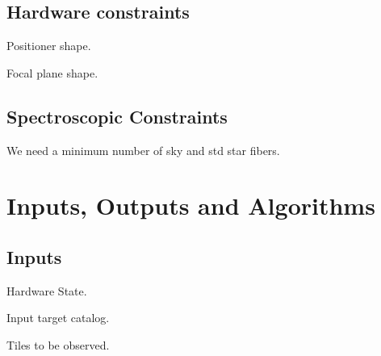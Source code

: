 \documentclass[onecolumn]{aastex63}
\begin{document}
\subsection{Hardware constraints}

Positioner shape.

Focal plane shape.


\subsection{Spectroscopic Constraints}

We need a minimum number of sky and std star fibers.

\section{Inputs, Outputs and Algorithms}

\subsection{Inputs}

Hardware State.

Input target catalog.

Tiles to be observed.







\end{document}
